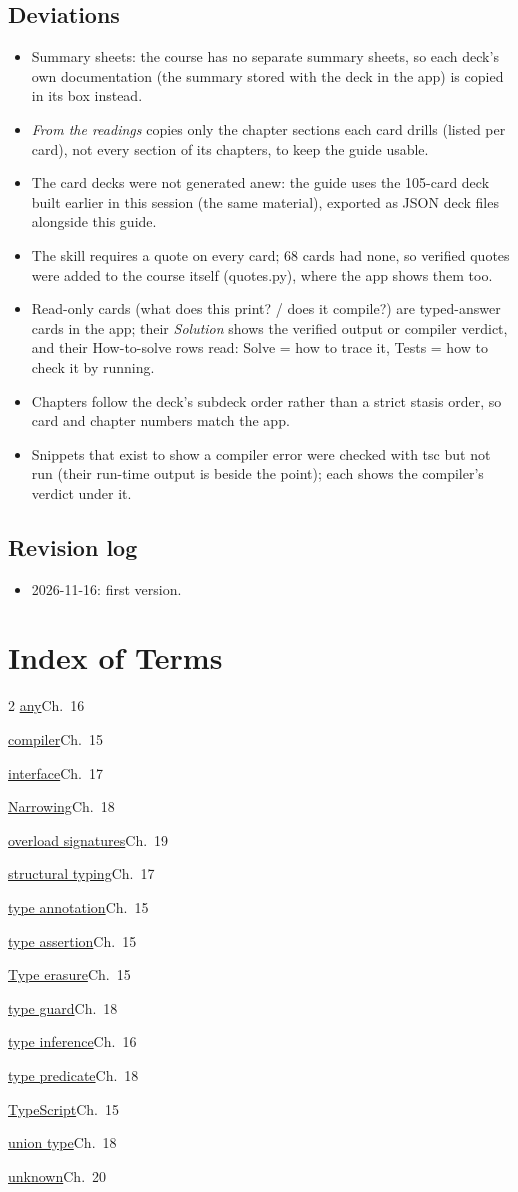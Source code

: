 \documentclass[10pt]{article}
\newcommand{\code}[1]{{\ttfamily\small #1}}
\newcommand{\ix}[3]{\hyperlink{t:#1}{#2}\dotfill #3\par}
\begin{document}
\subsection*{Deviations}
{\footnotesize\begin{itemize}
\item Summary sheets: the course has no separate summary sheets, so each deck's own documentation (the summary stored with the deck in the app) is copied in its box instead.
\item \emph{From the readings} copies only the chapter sections each card drills (listed per card), not every section of its chapters, to keep the guide usable.
\item The card decks were not generated anew: the guide uses the 105-card deck built earlier in this session (the same material), exported as JSON deck files alongside this guide.
\item The skill requires a quote on every card; 68 cards had none, so verified quotes were added to the course itself (\code{quotes.py}), where the app shows them too.
\item Read-only cards (what does this print? / does it compile?) are typed-answer cards in the app; their \emph{Solution} shows the verified output or compiler verdict, and their How-to-solve rows read: Solve = how to trace it, Tests = how to check it by running.
\item Chapters follow the deck's subdeck order rather than a strict stasis order, so card and chapter numbers match the app.
\item Snippets that exist to show a compiler error were checked with tsc but not run (their run-time output is beside the point); each shows the compiler's verdict under it.
\end{itemize}}
\subsection*{Revision log}
{\footnotesize\begin{itemize}
\item 2026-11-16: first version.
\end{itemize}}
\section*{Index of Terms}
{\small\begin{multicols}{2}
\ix{any}{any}{Ch.~16}
\ix{compiler}{compiler}{Ch.~15}
\ix{interface}{interface}{Ch.~17}
\ix{narrowing}{Narrowing}{Ch.~18}
\ix{overload}{overload signatures}{Ch.~19}
\ix{structural}{structural typing}{Ch.~17}
\ix{annotation}{type annotation}{Ch.~15}
\ix{assertion}{type assertion}{Ch.~15}
\ix{erasure}{Type erasure}{Ch.~15}
\ix{typeguard}{type guard}{Ch.~18}
\ix{inference}{type inference}{Ch.~16}
\ix{predicate}{type predicate}{Ch.~18}
\ix{typescript}{TypeScript}{Ch.~15}
\ix{union}{union type}{Ch.~18}
\ix{unknown}{unknown}{Ch.~20}
\end{multicols}}
\end{document}
